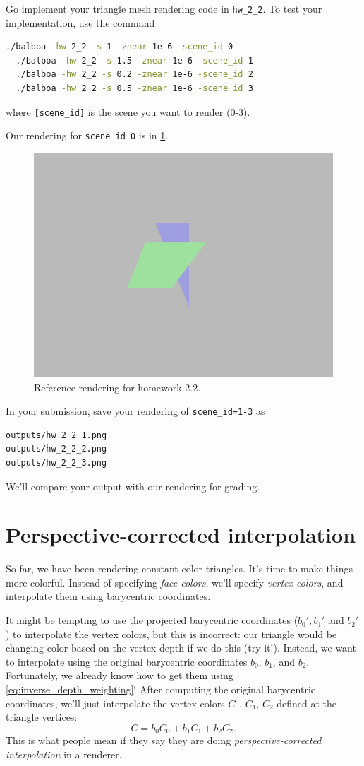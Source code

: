 Go implement your triangle mesh rendering code in \lstinline{hw_2_2}. To test your implementation, use the command
\begin{lstlisting}[language=bash]
  ./balboa -hw 2_2 -s 1 -znear 1e-6 -scene_id 0
  ./balboa -hw 2_2 -s 1.5 -znear 1e-6 -scene_id 1
  ./balboa -hw 2_2 -s 0.2 -znear 1e-6 -scene_id 2
  ./balboa -hw 2_2 -s 0.5 -znear 1e-6 -scene_id 3
\end{lstlisting}
where \lstinline{[scene_id]} is the scene you want to render (0-3).

Our rendering for \lstinline{scene_id 0} is in \cref{fig:hw2_2}.
\begin{figure}[h]
    \centering
    \includegraphics[width=0.5\linewidth]{imgs/hw_2_2.png}
    \caption{Reference rendering for homework 2.2.}
    \label{fig:hw2_2}
\end{figure}

In your submission, save your rendering of \lstinline{scene_id=1-3} as
\begin{lstlisting}[language=bash]
outputs/hw_2_2_1.png
outputs/hw_2_2_2.png
outputs/hw_2_2_3.png
\end{lstlisting}
We'll compare your output with our rendering for grading.

\section{Perspective-corrected interpolation}

So far, we have been rendering constant color triangles. It's time to make things more colorful. Instead of specifying \emph{face colors}, we'll specify \emph{vertex colors}, and interpolate them using barycentric coordinates.

It might be tempting to use the projected barycentric coordinates ($b_0', b_1'$ and $b_2'$) to interpolate the vertex colors, but this is incorrect: our triangle would be changing color based on the vertex depth if we do this (try it!). Instead, we want to interpolate using the original barycentric coordinates $b_0$, $b_1$, and $b_2$. Fortunately, we already know how to get them using \cref{eq:inverse_depth_weighting}! After computing the original barycentric coordinates, we'll just interpolate the vertex colors $C_0$, $C_1$, $C_2$ defined at the triangle vertices:
\begin{equation}
C = b_0 C_0 + b_1 C_1 + b_2 C_2.
\end{equation}
This is what people mean if they say they are doing \emph{perspective-corrected interpolation} in a renderer.

